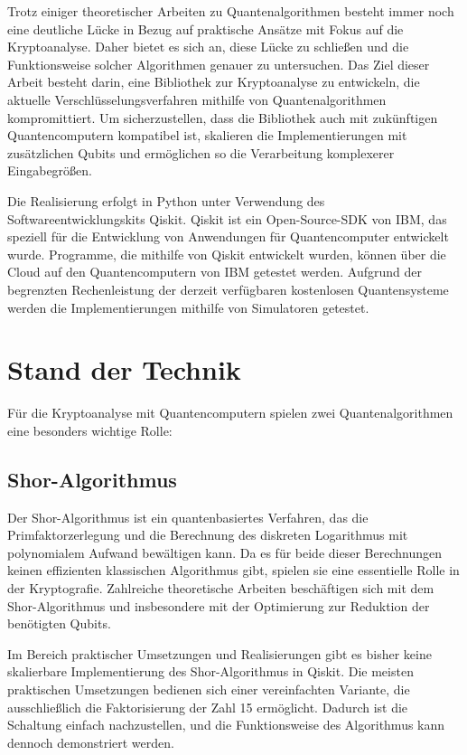 \documentclass[
	a4paper, %
	10pt, %
	unnumberedsections, %
	twoside, %
]{LTJournalArticle}
\begin{document}
Trotz einiger theoretischer Arbeiten zu Quantenalgorithmen besteht immer noch eine deutliche Lücke in Bezug auf praktische Ansätze mit Fokus auf die Kryptoanalyse. Daher bietet es sich an, diese Lücke zu schließen und die Funktionsweise solcher Algorithmen genauer zu untersuchen. Das Ziel dieser Arbeit besteht darin, eine Bibliothek zur Kryptoanalyse zu entwickeln, die aktuelle Verschlüsselungsverfahren mithilfe von Quantenalgorithmen kompromittiert. Um sicherzustellen, dass die Bibliothek auch mit zukünftigen Quantencomputern kompatibel ist, skalieren die Implementierungen mit zusätzlichen Qubits und ermöglichen so die Verarbeitung komplexerer Eingabegrößen.

Die Realisierung erfolgt in Python unter Verwendung des Softwareentwicklungskits Qiskit. Qiskit ist ein Open-Source-SDK von IBM, das speziell für die Entwicklung von Anwendungen für Quantencomputer entwickelt wurde. Programme, die mithilfe von Qiskit entwickelt wurden, können über die Cloud auf den Quantencomputern von IBM getestet werden. Aufgrund der begrenzten Rechenleistung der derzeit verfügbaren kostenlosen Quantensysteme werden die Implementierungen mithilfe von Simulatoren getestet.



\section{Stand der Technik}

Für die Kryptoanalyse mit Quantencomputern spielen zwei Quantenalgorithmen eine besonders wichtige Rolle:

\subsection{Shor-Algorithmus}
Der Shor-Algorithmus ist ein quantenbasiertes Verfahren, das die Primfaktorzerlegung und die Berechnung des diskreten Logarithmus mit polynomialem Aufwand bewältigen kann. Da es für beide dieser Berechnungen keinen effizienten klassischen Algorithmus gibt, spielen sie eine essentielle Rolle in der Kryptografie\autocite{Shor:1997}. Zahlreiche theoretische Arbeiten beschäftigen sich mit dem Shor-Algorithmus und insbesondere mit der Optimierung zur Reduktion der benötigten Qubits.

Im Bereich praktischer Umsetzungen und Realisierungen gibt es bisher keine skalierbare Implementierung des Shor-Algorithmus in Qiskit. Die meisten praktischen Umsetzungen bedienen sich einer vereinfachten Variante, die ausschließlich die Faktorisierung der Zahl 15 ermöglicht. Dadurch ist die Schaltung einfach nachzustellen, und die Funktionsweise des Algorithmus kann dennoch demonstriert werden\autocite{9376169, Monz_2016, IBM:Shor}.
\end{document}
